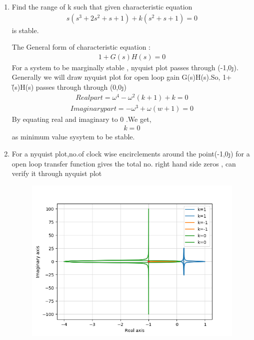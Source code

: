 \begin{enumerate}[label=\thesection.\arabic*.,ref=\thesection.\theenumi]
\item Find the range of k such that given characteristic equation
\begin{align}
s(s^3+2s^2+s+1) +k(s^2+s+1) = 0
\label{eq:ee18btech11042_1}
\end{align}
is stable.

\solution
The General form of characteristic equation :
\begin{align}
1+G(s)H(s) = 0
\label{eq:ee18btech11042_2}    
\end{align}
For a system to be marginally stable , nyquist plot passes through (-1,0\j ). Generally we will draw nyquist plot for open loop gain G(s)H(s).So,  1+\G(s)H(s) passes through through (0,0\j)
\begin{align}
Real part = \omega^4 - \omega^2(k+1) +k = 0
\label{eq:ee18btech11042_3}
\end{align}
\begin{align}
Imaginary part = -\omega^3 +\omega(w+1) = 0
\label{eq:ee18btech11042_4}
\end{align}
By equating real and imaginary to 0 .We get,
\begin{align}
k = 0
\label{eq:ee18btech11042_5}
\end{align}
as minimum value sysytem to be stable.
\item For a nyquist plot,no.of clock wise encirclements around the point(-1,0\j) for a open loop transfer function gives the total no. right hand side  zeros ,
\We can verify it through nyquist plot

\begin{figure}[!h]
  \includegraphics[width=\columnwidth]{./ee18btech11042_1.png}
  \label{fig:ee18btech11042_1.png}
\end{figure}



\end{enumerate}
